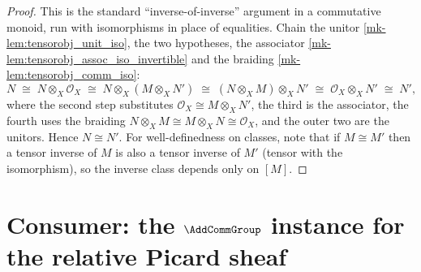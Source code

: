 \begin{proof}
  This is the standard ``inverse-of-inverse'' argument in a commutative monoid, run
  with isomorphisms in place of equalities. Chain the unitor
  \ref{mk-lem:tensorobj_unit_iso}, the two hypotheses, the associator
  \ref{mk-lem:tensorobj_assoc_iso_invertible} and the braiding
  \ref{mk-lem:tensorobj_comm_iso}:
  \[
    N
    \;\cong\; N \otimes_X \mathcal{O}_X
    \;\cong\; N \otimes_X (M \otimes_X N')
    \;\cong\; (N \otimes_X M) \otimes_X N'
    \;\cong\; \mathcal{O}_X \otimes_X N'
    \;\cong\; N',
  \]
  where the second step substitutes \(\mathcal{O}_X \cong M \otimes_X N'\), the
  third is the associator, the fourth uses the braiding
  \(N \otimes_X M \cong M \otimes_X N \cong \mathcal{O}_X\), and the outer two are
  the unitors. Hence \(N \cong N'\). For well-definedness on classes, note that if
  \(M \cong M'\) then a tensor inverse of \(M\) is also a tensor inverse of \(M'\)
  (tensor with the isomorphism), so the inverse class depends only on \([M]\).
\end{proof}

\section{Consumer: the \(\AddCommGroup\) instance for the relative Picard sheaf}
\label{mk-sec:tensorobj_consumer_acg}


